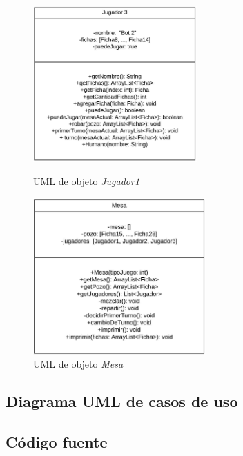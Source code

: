 \documentclass[12pt]{article}
\begin{document}
  \begin{figure}[h!]
    \centering
    \begin{minipage}[l]{0.45\textwidth}
      \centering
      \includegraphics[height=6cm]{umlo5.png}
      \caption{UML de objeto \textit{Jugador1}}
    \end{minipage}
    \begin{minipage}[r]{0.45\textwidth}
      \centering
      \includegraphics[height=6cm]{umlo6.png}
      \caption{UML de objeto \textit{Mesa}} 
    \end{minipage}
  \end{figure}

  \subsection{Diagrama UML de casos de uso}


  \subsection{Código fuente}
\end{document}
